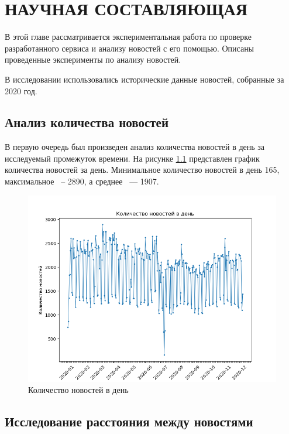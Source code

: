 \chapter{НАУЧНАЯ СОСТАВЛЯЮЩАЯ}
\label{chap:research}
\aftertitle

В этой главе рассматривается экспериментальная работа по проверке разработанного сервиса и анализу новостей с его помощью. Описаны проведенные эксперименты по анализу новостей.

В исследовании использовались исторические данные новостей, собранные за 2020 год.

\section{Анализ количества новостей}

В первую очередь был произведен анализ количества новостей в день за исследуемый промежуток времени. На рисунке \ref{img:news-count} представлен график количества новостей за день. Минимальное количество новостей в день 165, максимальное ~-- 2890, а среднее ~--- 1907.

\begin{figure}[h]
    \centering
    \includegraphics[width=\linewidth]{images/news-count.png}
    \caption{Количество новостей в день}
    \label{img:news-count}
\end{figure}

\section{Исследование расстояния между новостями}

